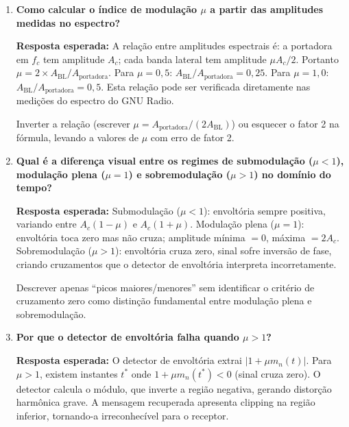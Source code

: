 \documentclass[11pt,a4paper]{article}
\begin{document}
\begin{enumerate}[label=\textbf{Q\arabic*.}, leftmargin=*, itemsep=1em]

  \item \textbf{Como calcular o índice de modulação $\mu$ a partir das amplitudes medidas no espectro?}

    \textbf{Resposta esperada:} A relação entre amplitudes espectrais é: a portadora em
    $f_c$ tem amplitude $A_c$; cada banda lateral tem amplitude $\mu A_c/2$. Portanto
    $\mu = 2 \times A_\text{BL} / A_\text{portadora}$. Para $\mu=0{,}5$:
    $A_\text{BL}/A_\text{portadora} = 0{,}25$. Para $\mu=1{,}0$:
    $A_\text{BL}/A_\text{portadora} = 0{,}5$. Esta relação pode ser verificada
    diretamente nas medições do espectro do GNU Radio.

    \begin{nota}
      Inverter a relação (escrever $\mu = A_\text{portadora}/(2A_\text{BL})$) ou esquecer
      o fator 2 na fórmula, levando a valores de $\mu$ com erro de fator 2.
    \end{nota}

  \item \textbf{Qual é a diferença visual entre os regimes de submodulação ($\mu<1$), modulação plena ($\mu=1$) e sobremodulação ($\mu>1$) no domínio do tempo?}

    \textbf{Resposta esperada:} Submodulação ($\mu<1$): envoltória sempre positiva,
    variando entre $A_c(1-\mu)$ e $A_c(1+\mu)$. Modulação plena ($\mu=1$): envoltória
    toca zero mas não cruza; amplitude mínima $= 0$, máxima $= 2A_c$. Sobremodulação
    ($\mu>1$): envoltória cruza zero, sinal sofre inversão de fase, criando cruzamentos
    que o detector de envoltória interpreta incorretamente.

    \begin{nota}
      Descrever apenas ``picos maiores/menores'' sem identificar o critério de cruzamento
      zero como distinção fundamental entre modulação plena e sobremodulação.
    \end{nota}

  \item \textbf{Por que o detector de envoltória falha quando $\mu > 1$?}

    \textbf{Resposta esperada:} O detector de envoltória extrai $|1 + \mu m_n(t)|$.
    Para $\mu > 1$, existem instantes $t^*$ onde $1 + \mu m_n(t^*) < 0$ (sinal cruza
    zero). O detector calcula o módulo, que inverte a região negativa, gerando distorção
    harmônica grave. A mensagem recuperada apresenta clipping na região inferior,
    tornando-a irreconhecível para o receptor.


\end{enumerate}
\end{document}
